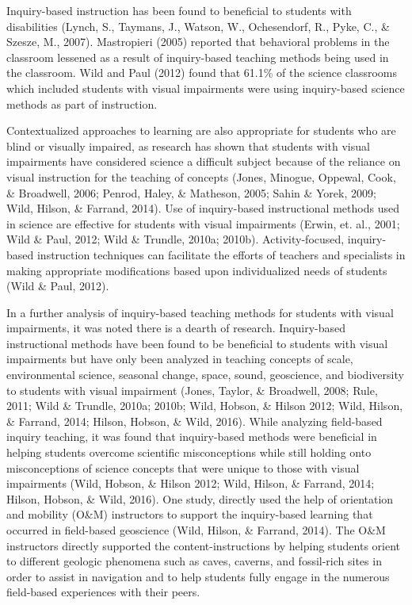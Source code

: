 \documentclass[11.5pt]{sig-alternate} %
\begin{document}
\begin{large}
Inquiry-based instruction has been found to beneficial to students with disabilities (Lynch, S., Taymans, J., Watson, W., Ochesendorf, R., Pyke, C., \& Szesze, M., 2007).  Mastropieri (2005) reported that behavioral problems in the classroom lessened as a result of inquiry-based teaching methods being used in the classroom.  Wild and Paul (2012) found that 61.1\% of the science classrooms which included students with visual impairments were using inquiry-based science methods as part of instruction.  
	
 Contextualized approaches to learning are also appropriate for students who are blind or visually impaired, as research has shown that students with visual impairments have considered science a difficult subject because of the reliance on visual instruction for the teaching of concepts (Jones, Minogue, Oppewal, Cook, \& Broadwell, 2006; Penrod, Haley, \& Matheson, 2005; Sahin \& Yorek, 2009; Wild, Hilson, \& Farrand, 2014).  Use of inquiry-based instructional methods used in science are effective for students with visual impairments (Erwin, et. al., 2001; Wild \& Paul, 2012; Wild \& Trundle, 2010a; 2010b).  Activity-focused, inquiry-based instruction techniques can facilitate the efforts of teachers and specialists in making appropriate modifications based upon individualized needs of students (Wild \& Paul, 2012).
 
In a further analysis of inquiry-based teaching methods for students with visual impairments, it was noted there is a dearth of research.  Inquiry-based instructional methods have been found to be beneficial to students with visual impairments but have only been analyzed in teaching concepts of scale, environmental science, seasonal change, space, sound, geoscience, and biodiversity to students with visual impairment (Jones, Taylor, \& Broadwell, 2008; Rule, 2011; Wild \& Trundle, 2010a; 2010b; Wild, Hobson, \& Hilson 2012; Wild, Hilson, \& Farrand, 2014; Hilson, Hobson, \& Wild, 2016).  While analyzing field-based inquiry teaching, it was found that inquiry-based methods were beneficial in helping students overcome scientific misconceptions while still holding onto misconceptions of science concepts that were unique to those with visual impairments (Wild, Hobson, \& Hilson 2012; Wild, Hilson, \& Farrand, 2014; Hilson, Hobson, \& Wild, 2016).  One study, directly used the help of orientation and mobility (O\&M) instructors to support the inquiry-based learning that occurred in field-based geoscience (Wild, Hilson, \& Farrand, 2014).  The O\&M instructors directly supported the content-instructions by helping students orient to different geologic phenomena such as caves, caverns, and fossil-rich sites in order to assist in navigation and to help students fully engage in the numerous field-based experiences with their peers. 


\end{large}
\end{document}
